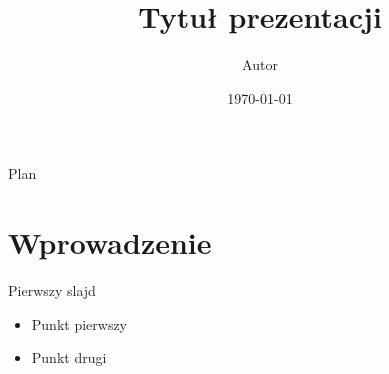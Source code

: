 \documentclass[aspectratio=169]{beamer}
\title{Tytuł prezentacji}
\author{Autor}
\date{\today}
\begin{document}
\maketitle

\begin{frame}{Plan}
  \tableofcontents
\end{frame}

\section{Wprowadzenie}
\begin{frame}{Pierwszy slajd}
  \begin{itemize}
    \item Punkt pierwszy
    \item Punkt drugi
  \end{itemize}
\end{frame}
\end{document}
